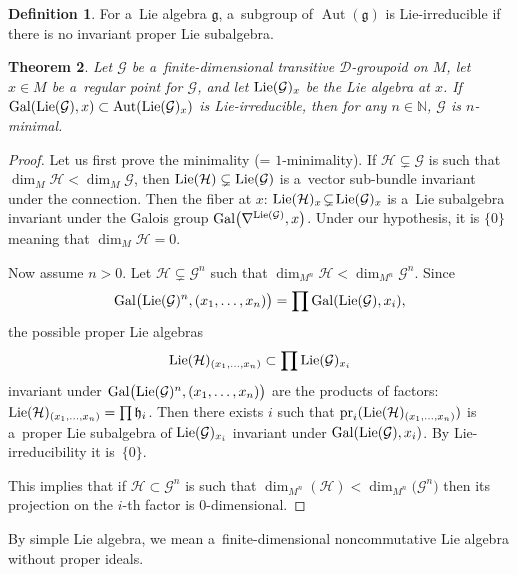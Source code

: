 \documentclass[10pt,a4paper]{amsart}
\numberwithin{equation}{section}
\newtheorem{Theorem}{Theorem}[section]
\theoremstyle{definition}
\newtheorem{Definition}[Theorem]{Definition}
\begin{document}
\begin{Definition}
For a~Lie algebra $\mathfrak g$, a~subgroup of $\operatorname{Aut}(\mathfrak g)$ is Lie-irreducible if there is no invariant proper Lie subalgebra.
\end{Definition}


\begin{Theorem}\label{thm:6}
 Let $\mathcal G$ be a~finite-dimensional transitive $\mathcal D$-groupoid on $M$, let $x\in M$ be a~regular point for $\mathcal G$, and let ${\rm Lie}(\mathcal G)_x$ be the Lie algebra at $x$.
 If ${\rm Gal}({\rm Lie}(\mathcal G),x) \subset \operatorname{Aut}({\rm Lie}(\mathcal G)_x)$ is Lie-irreducible, then for any $n \in \mathbb N$, $\mathcal G$ is $n$-minimal.
\end{Theorem}


\begin{proof}
Let us first prove the minimality (= $1$-minimality). If $\mathcal H \subsetneq \mathcal G$ is such that $\dim_M \mathcal H < \dim_M \mathcal G$, then ${\rm Lie}(\mathcal H)\subsetneq {\rm Lie}(\mathcal G)$ is a~vector sub-bundle invariant under the connection. Then the fiber at $x$: ${\rm Lie}(\mathcal H)_x \!\subsetneq\! {\rm Lie}(\mathcal G)_x$ is a~Lie subalgebra invariant under the Galois group ${\rm Gal}\bigl(\nabla^{{\rm Lie}(\mathcal G)}, x\bigr)$. Under our hypothesis, it is $\{0\}$ meaning that $\dim_M \mathcal H = 0$.

Now assume $n > 0$. Let $\mathcal H\subsetneq \mathcal G^n$ such that $\dim_{M^n} \mathcal H < \dim_{M^n} \mathcal G^n$. Since
\[
{\rm Gal}\bigl({\rm Lie}(\mathcal G) ^n,(x_1, \dots, x_n)\bigr) = \prod {\rm Gal}({\rm Lie}(\mathcal G), x_i),
\] the possible proper Lie algebras
\[
{\rm Lie}(\mathcal H)_{(x_1, \dots, x_n)} \subset \prod \mathfrak {\rm Lie}(\mathcal G)_{x_i}
\] invariant under ${\rm Gal}\bigl({\rm Lie}(\mathcal G) ^n,(x_1, \dots, x_n)\bigr)$ are the products of factors: ${\rm Lie}(\mathcal H)_{(x_1, \dots, x_n)} = \prod \mathfrak h_i$. Then there exists $i$ such that ${\rm pr}_i({\rm Lie}(\mathcal H)_{(x_1, \dots, x_n)})$ is a~proper Lie subalgebra of ${\rm Lie}(\mathcal G)_{x_i}$ invariant under ${\rm Gal}({\rm Lie}(\mathcal G), x_i)$. By Lie-irreducibility it is~$\{0\}$.

This implies that if $\mathcal H \subset \mathcal G^n$ is such that $\dim_{M^n}(\mathcal H) < \dim_{M^n}\bigl(\mathcal G^n\bigr)$ then its projection on the $i$-th factor is 0-dimensional.
\end{proof}

By simple Lie algebra, we mean a~finite-dimensional noncommutative Lie algebra without proper ideals.
\end{document}
